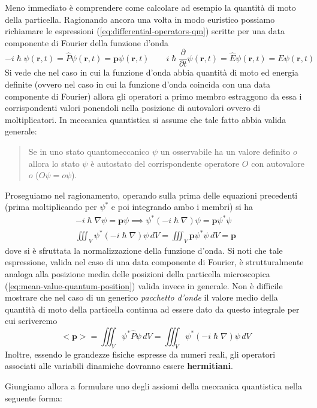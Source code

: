 Meno immediato è comprendere come calcolare ad esempio la quantità di
moto della particella.
Ragionando ancora una volta in modo euristico
possiamo richiamare le espressioni (\ref{eq:differential-operators-qm}) scritte per
una data componente di Fourier della funzione d'onda
\[
    - i \hslash \psi(\bm{r},t) = \hat{P} \psi(\bm{r},t) = \bm{p} \psi(\bm{r},t) \qquad
    i \hslash \frac{\partial}{\partial t} \psi(\bm{r},t) = \hat{E}\psi(\bm{r},t)= E\psi(\bm{r},t)
\] Si vede che nel caso in cui la funzione d'onda abbia quantità di moto
ed energia definite (ovvero nel caso in cui la funzione d'onda coincida
con una data componente di Fourier) allora gli operatori a primo membro
estraggono da essa i corrispondenti valori ponendoli nella posizione di
autovalori ovvero di moltiplicatori.
In meccanica quantistica si assume
che tale fatto abbia valida generale:
\begin{quote}
    Se in uno stato quantomeccanico \(\psi\) un osservabile ha un valore
    definito \(o\) allora lo stato \(\psi\) è autostato del corrispondente
    operatore \(O\) con autovalore \(o\) (\(O \psi = o \psi\)).
\end{quote}

Proseguiamo nel ragionamento, operando sulla prima delle equazioni
precedenti (prima moltiplicando per \(\psi^{*}\) e poi integrando ambo i
membri) si ha
\begin{gather*}
    - i \hslash \nabla \psi = \bm{p} \psi \implies
    \psi^{*}(-i \hslash \nabla) \psi = \bm{p} \psi^{*}\psi\\
    \iiint_{V} \psi^{*}(-i \hslash \nabla) \psi \, dV = \iiint_{V} \bm{p} \psi^{*}\psi \, dV = \bm{p}
\end{gather*} dove si è sfruttata la normalizzazione della funzione d'onda.
Si noti
che tale espressione, valida nel caso di una data componente di Fourier,
è strutturalmente analoga alla posizione media delle posizioni della
particella microscopica (\ref{eq:mean-value-quantum-position}) valida invece in generale.
Non è difficile mostrare che nel caso di un generico \emph{pacchetto d'onde} il
valore medio della quantità di moto della particella continua ad essere
dato da questo integrale per cui scriveremo
\[
    <\bm{p}> = \iiint_{V} \psi^{*}\hat{P}\psi \, dV = \iiint_{V} \psi^{*}(- i \hslash \nabla )\psi \, dV
\] Inoltre, essendo le grandezze fisiche espresse da numeri reali, gli
operatori associati alle variabili dinamiche dovranno essere
\textbf{hermitiani}.

Giungiamo allora a formulare uno degli assiomi della meccanica
quantistica nella seguente forma:

